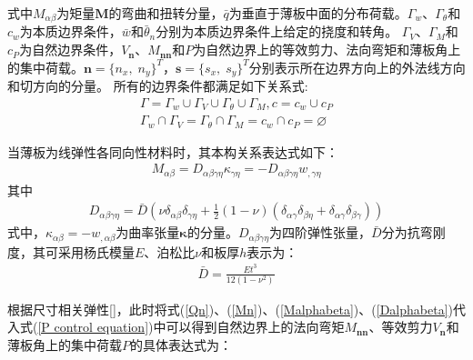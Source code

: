式中$M_{\alpha\beta}$为矩量$\boldsymbol M$的弯曲和扭转分量，$\bar q$为垂直于薄板中面的分布荷载。$\Gamma_w$、$\Gamma_{\theta}$和$c_w$为本质边界条件，$\bar w$和$\bar \theta_n$分别为本质边界条件上给定的挠度和转角。
$\Gamma_V$、$\Gamma_M$和$c_P$为自然边界条件，$V_{\boldsymbol n}$、$M_{\boldsymbol{nn}}$和$P$为自然边界上的等效剪力、法向弯矩和薄板角上的集中荷载。$\pmb{n}=\{n_x,\; n_y\}^T$，$\pmb{s}=\{s_x,\; s_y\}^T$分别表示所在边界方向上的外法线方向和切方向的分量。
所有的边界条件都满足如下关系式:
\begin{equation}\label{PGeometric relationships}
    \begin{split}
        \Gamma=\Gamma_w\cup\Gamma_V\cup\Gamma_{\theta}\cup\Gamma_M,c=c_w\cup c_P\\
        \Gamma_w\cap\Gamma_V=\Gamma_{\theta}\cap\Gamma_M=c_w\cap c_P=\varnothing
    \end{split}
\end{equation}\par
当薄板为线弹性各同向性材料时，其本构关系表达式如下：
\begin{equation}
    \begin{split}\label{Malphabeta}
        M_{\alpha\beta}=D_{\alpha\beta\gamma\eta}\kappa_{\gamma\eta}=-D_{\alpha\beta\gamma\eta}w_{,\gamma\eta}
    \end{split}
\end{equation}
其中
\begin{equation}
    \begin{split}\label{Dalphabeta}
        D_{\alpha\beta\gamma\eta}=\bar D(\nu\delta_{\alpha\beta}\delta_{\gamma\eta}+\frac{1}{2}(1-\nu)(\delta_{\alpha\gamma}\delta_{\beta\eta}+\delta_{\alpha\gamma}\delta_{\beta\gamma}))
    \end{split}
\end{equation}
式中，$\kappa_{\alpha\beta}=-w_{,\alpha\beta}$为曲率张量$\boldsymbol \kappa$的分量。$D_{\alpha \beta \gamma \eta}$为四阶弹性张量，$\bar{D}$分为抗弯刚度，其可采用杨氏模量$E$、泊松比$\nu$和板厚$h$表示为：
\begin{equation}
    \begin{split}
    \bar D=\frac{Et^3}{12(1-\nu^2)}
    \end{split}
    \end{equation}\par
根据尺寸相关弹性[]，此时将式(\ref{Qn})、(\ref{Mn})、(\ref{Malphabeta})、(\ref{Dalphabeta})代入式(\ref{P control equation})中可以得到自然边界上的法向弯矩$M_{\pmb{nn}}$、等效剪力$V_{\pmb{n}}$和薄板角上的集中荷载$P$的具体表达式为：
